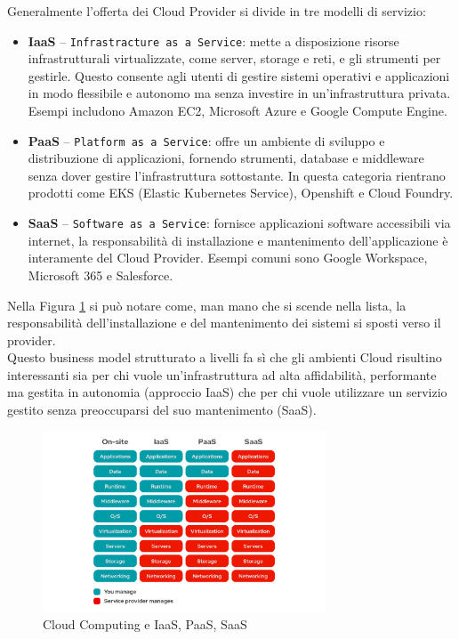 Generalmente l'offerta dei Cloud Provider si divide in tre modelli di servizio\cite{Khurana2013Comparison}:
\begin{itemize}

    \item \textbf{IaaS} -- \texttt{Infrastracture as a Service}: mette a disposizione risorse infrastrutturali virtualizzate, come server, storage e reti, e gli strumenti per gestirle. Questo consente agli utenti di gestire sistemi operativi e applicazioni in modo flessibile e autonomo ma senza investire in un'infrastruttura privata. Esempi includono Amazon EC2, Microsoft Azure e Google Compute Engine.
    
    \item \textbf{PaaS} -- \texttt{Platform as a Service}: offre un ambiente di sviluppo e distribuzione di applicazioni, fornendo strumenti, database e middleware senza dover gestire l'infrastruttura sottostante. In questa categoria rientrano prodotti come EKS (Elastic Kubernetes Service), Openshift e Cloud Foundry.

    \item \textbf{SaaS} -- \texttt{Software as a Service}: fornisce applicazioni software accessibili via internet, la responsabilità di installazione e mantenimento dell'applicazione è interamente del Cloud Provider. Esempi comuni sono Google Workspace, Microsoft 365 e Salesforce.
\end{itemize}

Nella Figura \ref{fig:cloud_structure} si può notare come, man mano che si scende nella lista, la responsabilità dell'installazione e del mantenimento dei sistemi si sposti verso il provider.\\ Questo business model strutturato a livelli fa sì che gli ambienti Cloud risultino interessanti sia per chi vuole un'infrastruttura ad alta affidabilità, performante ma gestita in autonomia (approccio IaaS) che per chi vuole utilizzare un servizio gestito senza preoccuparsi del suo mantenimento (SaaS)\cite{Tsai2014Software-as-a-service}.

\FloatBarrier
\begin{figure}[h]
    \centering
    \includegraphics[width=0.75\textwidth]{img/iaas-paas-saas-diagram5.1-1638x1046.png}
    \caption{Cloud Computing e IaaS, PaaS, SaaS\protect\footnotemark}
    \label{fig:cloud_structure}
\end{figure}
\FloatBarrier

